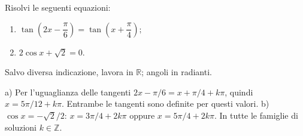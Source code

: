 
\begin{esercizio}
Risolvi le seguenti equazioni: 

\begin{enumerate}
\item $\displaystyle\tan\left(2x-\dfrac{\pi}{6}\right)
 =\tan\left(x+\dfrac{\pi}{4}\right);$

\item $\displaystyle 2\cos x+\sqrt{2}=0.$
\end{enumerate}
Salvo diversa indicazione, lavora in $\mathbb R$; angoli in radianti.
\end{esercizio}

\begin{soluzione}
a) Per l'uguaglianza delle tangenti $2x-\pi/6=x+\pi/4+k\pi$,
quindi $x=5\pi/12+k\pi$. Entrambe le tangenti sono definite per questi valori.
b) $\cos x=-\sqrt2/2$: $x=3\pi/4+2k\pi$ oppure $x=5\pi/4+2k\pi$. In tutte le famiglie di soluzioni $k\in\mathbb{Z}$.
\end{soluzione}
